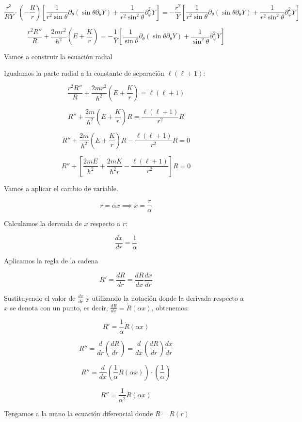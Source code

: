 \documentclass[a4paper]{article}
\begin{document}
$$\frac{r^3}{R Y} \cdot \left( -\frac{R}{r} \right) \left[ \frac{1}{r^2 \sin\theta} \partial_\theta (\sin\theta \partial_\theta Y) + \frac{1}{r^2 \sin^2\theta} \partial_\varphi^2 Y \right] = -\frac{r^2}{Y} \left[ \frac{1}{r^2 \sin\theta} \partial_\theta (\sin\theta \partial_\theta Y) + \frac{1}{r^2 \sin^2\theta} \partial_\varphi^2 Y \right]$$

$$\frac{r^2 R''}{R} + \frac{2m r^2}{\hbar^2}\left(E + \frac{K}{r}\right) = -\frac{1}{Y} \left[ \frac{1}{\sin\theta} \partial_\theta (\sin\theta \partial_\theta Y) + \frac{1}{\sin^2\theta} \partial_\varphi^2 Y \right]$$


Vamos a construir la ecuación radial

Igualamos la parte radial a la constante de separación $\ell(\ell+1)$:

$$\frac{r^2 R''}{R} + \frac{2m r^2}{\hbar^2}\left(E + \frac{K}{r}\right) = \ell(\ell+1)$$

$$R'' + \frac{2m}{\hbar^2}\left(E + \frac{K}{r}\right)R = \frac{\ell(\ell+1)}{r^2}R$$

$$R'' + \frac{2m}{\hbar^2}\left(E + \frac{K}{r}\right)R - \frac{\ell(\ell+1)}{r^2}R = 0$$

$$R'' + \left[ \frac{2mE}{\hbar^2} + \frac{2mK}{\hbar^2 r} - \frac{\ell(\ell+1)}{r^2} \right] R = 0$$

Vamos a aplicar el cambio de variable.

$$r = \alpha x \implies x = \frac{r}{\alpha}$$

Calculamos la derivada de $x$ respecto a $r$:

$$\frac{dx}{dr} = \frac{1}{\alpha}$$

Aplicamos la regla de la cadena

$$R' = \frac{dR}{dr} = \frac{dR}{dx}\frac{dx}{dr}$$

Sustituyendo el valor de $\frac{dx}{dr}$ y utilizando la notación donde la derivada respecto a $x$ se denota con un punto, es decir, $\frac{dR}{dx} = \dot{R}(\alpha x)$, obtenemos:

$$R' = \frac{1}{\alpha} \dot{R}(\alpha x)$$

$$R'' = \frac{d}{dr}\left(\frac{dR}{dr}\right) = \frac{d}{dx}\left(\frac{dR}{dr}\right) \frac{dx}{dr}$$

$$R'' = \frac{d}{dx}\left(\frac{1}{\alpha} \dot{R}(\alpha x)\right) \cdot \left(\frac{1}{\alpha}\right)$$

$$R'' = \frac{1}{\alpha^2} \ddot{R}(\alpha x)$$

Tengamos a la mano la ecuación diferencial donde $R=R(r)$
\end{document}
